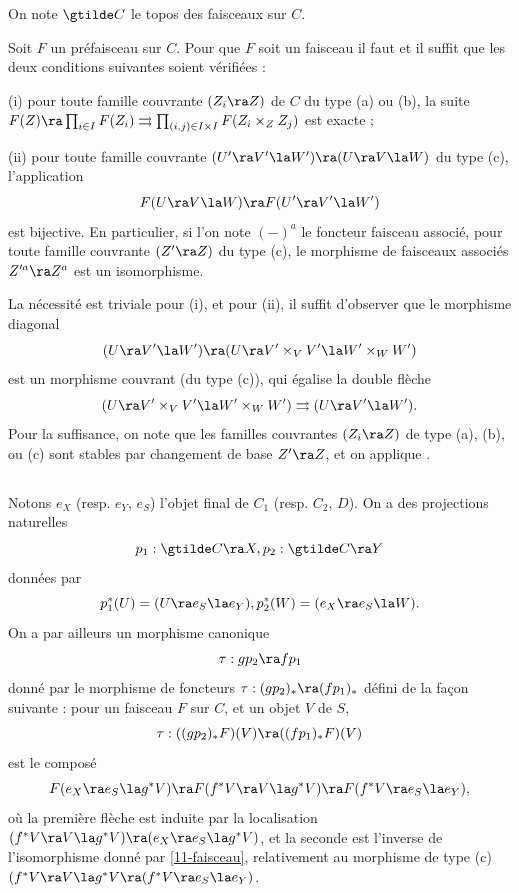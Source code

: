\documentclass[10pt]{../fichiers-configuration-latex/smfart}
\begin{document}
On note $\gtilde C$ le topos des faisceaux sur $C$.

\begin{lemme}\label{11-faisceau}
Soit $F$ un préfaisceau sur $C$. Pour que $F$ soit un
faisceau il faut et il suffit que les deux conditions
suivantes soient vérifiées :

(i) pour toute famille couvrante $(Z_i \ra Z)$ de $C$ du type (a) ou (b), la suite $F(Z) \ra
\prod_{i \in I} F(Z_i) \rightrightarrows \prod_{(i,j) \in I \times I} F(Z_i \times_Z Z_j)$ est
exacte ;

(ii) pour toute famille couvrante $(U' \ra V' \la W') \ra (U \ra V \la W)$ du type (c),
l'application $$ F(U \ra V \la W) \ra F(U' \ra V' \la W') $$ est bijective. En particulier, si l'on
note $(-)^a$ le foncteur faisceau associé, pour toute famille couvrante $(Z' \ra Z)$ du type (c), le
morphisme de faisceaux associés $Z'^a \ra Z^a$ est un isomorphisme.
\end{lemme}

La nécessité est triviale pour (i), et pour (ii), il suffit d'observer que le morphisme diagonal $$
(U \ra V' \la W') \ra (U \ra V' \times_V V' \la W' \times_W W') $$ est un morphisme couvrant (du
type (c)), qui égalise la double flèche $$ (U \ra V' \times_V V' \la W' \times_W W')
\rightrightarrows (U \ra V' \la W').  $$ Pour la suffisance, on note que les familles couvrantes
$(Z_i \ra Z)$ de type (a), (b), ou (c) sont stables par changement de base $Z' \ra Z$, et on
applique .

\subsection{}\label{11-tau} Notons $e_X$ (resp. $e_Y$, $e_S$) l'objet final de $C_1$ (resp. $C_2$,
$D$). On a des projections naturelles $$ p_1 : \gtilde C \ra X, p_2 : \gtilde C \ra Y $$ données par
$$ p_1^*(U) = (U \ra e_S \la e_Y), p_2^*(W) = (e_X \ra e_S \la W).  $$ On a par ailleurs un
morphisme canonique $$ \tau : gp_2 \ra fp_1 $$ donné par le morphisme de foncteurs $\tau : (gp_2)_*
\ra (fp_1)_*$ défini de la façon suivante : pour un faisceau $F$ sur $C$, et un objet $V$ de $S$, $$
\tau : ((gp_2)_*F)(V) \ra ((fp_1)_*F)(V) $$ est le composé $$ F(e_X \ra e_S \la g^*V) \ra F(f^*V \ra
V \la g^*V) \ra F(f^*V \ra e_S \la e_Y), $$ où la première flèche est induite par la localisation
$(f^*V \ra V \la g^*V) \ra (e_X \ra e_S \la g^*V)$, et la seconde est l'inverse de l'isomorphisme
donné par \ref{11-faisceau}, relativement au morphisme de type (c) $(f^*V \ra V \la g^*V \ra (f^*V
\ra e_S \la e_Y)$.
\end{document}
